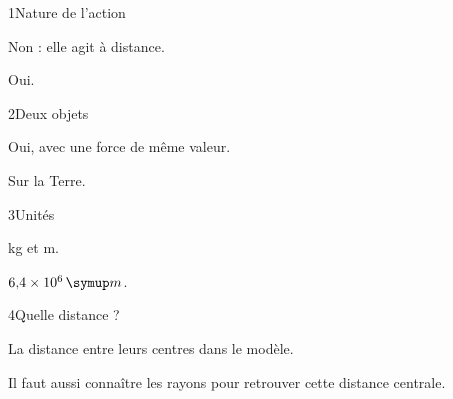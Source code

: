 \par\noindent\begin{minipage}{\linewidth}
\begin{corrige}{1}{Nature de l’action}
\begin{questions}
\item Non : elle agit à distance.
\item Oui.
\end{questions}
\end{corrige}
\end{minipage}
\par\noindent\begin{minipage}{\linewidth}
\begin{corrige}{2}{Deux objets}
\begin{questions}
\item Oui, avec une force de même valeur.
\item Sur la Terre.
\end{questions}
\end{corrige}
\end{minipage}
\par\noindent\begin{minipage}{\linewidth}
\begin{corrige}{3}{Unités}
\begin{questions}
\item kg et m.
\item $6{,}4\times10^6\unite m$.
\end{questions}
\end{corrige}
\end{minipage}
\par\noindent\begin{minipage}{\linewidth}
\begin{corrige}{4}{Quelle distance ?}
\begin{questions}
\item La distance entre leurs centres dans le modèle.
\item Il faut aussi connaître les rayons pour retrouver cette distance centrale.
\end{questions}
\end{corrige}
\end{minipage}
